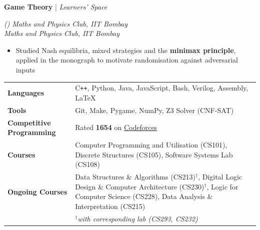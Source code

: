\documentclass[11pt]{article}
\newcommand{\xfill}[2][1ex]{%
	\dimen0=#2\advance\dimen0 by #1
	\leaders\hrule height \dimen0 depth -#1\hfill
}
\renewcommand{\section}[1]{%
	\par\vspace{9pt}
	{\color{Blue}{\Large\scshape\raggedright #1\xfill[0pt]{0.5pt}}}\par\vspace{3pt}
}
\newcommand{\filldate}[1]{%
	\def\tempdate{#1}%
	\ifx\tempdate\empty\else\strut\hfill{\small\textit{(#1)}}\fi
}
\renewcommand{\subsection}[4]{%
	\def\temp{#4}%
	\par\vspace{5pt}
	{%
		\large
		{\color{Green}\textbf{#1}} | {\sl #2}\filldate{#3}%
		\ifx\temp\empty
		\else
		{\\[0.1em]\fontsize{11}{13.2}\selectfont\sl #4}%
		\fi
	}%
}
\begin{document}
\subsection{Game Theory}{Learners' Space}{}{\textit{Maths and Physics Club, IIT Bombay}}
\begin{itemize}
    \item Studied Nash equilibria, mixed strategies and the \textbf{minimax principle}, applied in the monograph to motivate randomisation against adversarial inputs
\end{itemize}

\section{Technical Skills \& Courses}


\begin{tabularx}{\textwidth}{ p{5.2cm} >{\raggedright\arraybackslash}X }
	\textbf{Languages}               & C\texttt{++}, Python, Java, JavaScript, Bash, Verilog, Assembly, \LaTeX \\
	\textbf{Tools}                   & Git, Make, Pygame, NumPy, Z3 Solver (CNF-SAT) \\
	\textbf{Competitive Programming} & Rated \textbf{1654} on \href{https://codeforces.com/profile/Sahil_Deo}{Codeforces} \\
	\textbf{Courses}                 & Computer Programming and Utilisation (CS101), Discrete Structures (CS105), Software Systems Lab (CS108) \\
	\textbf{Ongoing Courses}         & Data Structures \& Algorithms (CS213)$^\dagger$, Digital Logic Design \& Computer Architecture (CS230)$^\dagger$, Logic for Computer Science (CS228), Data Analysis \& Interpretation (CS215) \\
	                                 & {\small\sl $^\dagger$with corresponding lab (CS293, CS232)} \\
\end{tabularx}
\end{document}
